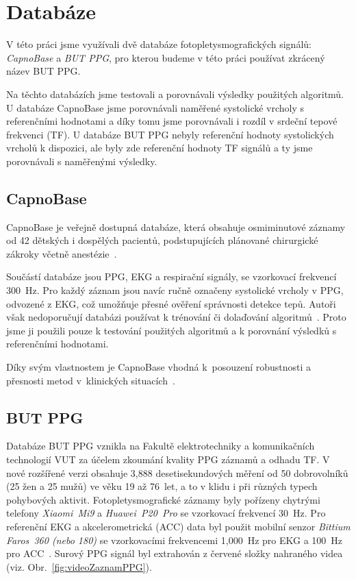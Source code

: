 \raggedbottom
\chapter{Databáze}
\label{chap:databaze}

V této práci jsme využívali dvě databáze fotopletysmografických signálů: \textit{CapnoBase} a \textit{\acl{BUT PPG}}, pro kterou budeme v této práci používat zkrácený název \acs{BUT PPG}.

Na těchto databázích jsme testovali a porovnávali výsledky použitých algoritmů.
U databáze CapnoBase jsme porovnávali naměřené systolické vrcholy s referenčními hodnotami a díky tomu jsme porovnávali i rozdíl v srdeční tepové frekvenci (\acs{TF}).
U databáze \acs{BUT PPG} nebyly referenční hodnoty systolických vrcholů k dispozici, ale byly zde referenční hodnoty \acs{TF} signálů a ty jsme porovnávali s naměřenými výsledky.

\section{CapnoBase}
\label{sec:capnobase}

CapnoBase je veřejně dostupná databáze, která obsahuje osmiminutové záznamy od 42 dětských i dospělých pacientů, podstupujících plánované chirurgické zákroky včetně anestézie~\cite{CapnoBase}.

Součástí databáze jsou \acs{PPG}, \acs{EKG} a respirační signály, se vzorkovací frekvencí 300~Hz.
Pro každý záznam jsou navíc ručně označeny systolické vrcholy v \acs{PPG}, odvozené z \acs{EKG}, což umožňuje přesné ověření správnosti detekce tepů.
Autoři však nedoporučují databázi používat k trénování či dolaďování algoritmů~\cite{CapnoBase}.
Proto jsme ji použili pouze k testování použitých algoritmů a k porovnání výsledků s referenčními hodnotami.

Díky svým vlastnostem je CapnoBase vhodná k~posouzení robustnosti a přesnosti metod v~klinických situacích~\cite{Karlen2013, Charlton2022}.

\section{\acs{BUT PPG}}
\label{sec:but_ppg}

Databáze \acs{BUT PPG} vznikla na Fakultě elektrotechniky a komunikačních technologií \acs{VUT} za účelem zkoumání kvality \acs{PPG} záznamů a odhadu \acs{TF}.
V nové rozšířené verzi obsahuje 3,888 desetisekundových měření od 50 dobrovolníků (25 žen a 25 mužů) ve věku 19 až 76~let, a to v klidu i při různých typech pohybových aktivit.
Fotopletysmografické záznamy byly pořízeny chytrými telefony \textit{Xiaomi~Mi9} a \textit{Huawei~P20~Pro} se vzorkovací frekvencí 30~Hz.
Pro referenční \acs{EKG} a akcelerometrická (\acs{ACC}) data byl použit mobilní senzor \textit{Bittium Faros~360 (nebo 180)} se vzorkovacími frekvencemi 1,000~Hz pro \acs{EKG} a 100~Hz pro \acs{ACC}~\cite{BUT_PPG}.
Surový \acs{PPG} signál byl extrahován z červené složky nahraného videa (viz. Obr.~\ref{fig:videoZaznamPPG}).

